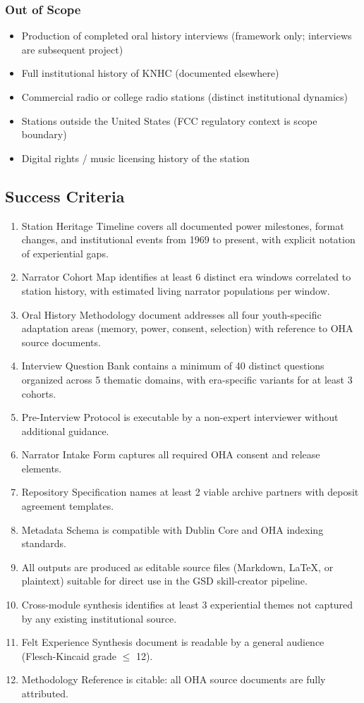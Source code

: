 \documentclass[11pt,letterpaper]{article}
\begin{document}
\subsubsection{Out of Scope}
\begin{itemize}
  \item Production of completed oral history interviews (framework only; interviews are subsequent project)
  \item Full institutional history of KNHC (documented elsewhere)
  \item Commercial radio or college radio stations (distinct institutional dynamics)
  \item Stations outside the United States (FCC regulatory context is scope boundary)
  \item Digital rights / music licensing history of the station
\end{itemize}

\subsection{Success Criteria}

\begin{enumerate}
  \item Station Heritage Timeline covers all documented power milestones, format changes, and institutional events from 1969 to present, with explicit notation of experiential gaps.
  \item Narrator Cohort Map identifies at least 6 distinct era windows correlated to station history, with estimated living narrator populations per window.
  \item Oral History Methodology document addresses all four youth-specific adaptation areas (memory, power, consent, selection) with reference to OHA source documents.
  \item Interview Question Bank contains a minimum of 40 distinct questions organized across 5 thematic domains, with era-specific variants for at least 3 cohorts.
  \item Pre-Interview Protocol is executable by a non-expert interviewer without additional guidance.
  \item Narrator Intake Form captures all required OHA consent and release elements.
  \item Repository Specification names at least 2 viable archive partners with deposit agreement templates.
  \item Metadata Schema is compatible with Dublin Core and OHA indexing standards.
  \item All outputs are produced as editable source files (Markdown, LaTeX, or plaintext) suitable for direct use in the GSD skill-creator pipeline.
  \item Cross-module synthesis identifies at least 3 experiential themes not captured by any existing institutional source.
  \item Felt Experience Synthesis document is readable by a general audience (Flesch-Kincaid grade $\leq$ 12).
  \item Methodology Reference is citable: all OHA source documents are fully attributed.
\end{enumerate}
\end{document}
